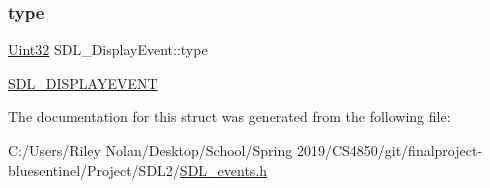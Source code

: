 \subsubsection{\texorpdfstring{type}{type}}
{\footnotesize\ttfamily \mbox{\hyperlink{_s_d_l__stdinc_8h_add440eff171ea5f55cb00c4a9ab8672d}{Uint32}} S\+D\+L\+\_\+\+Display\+Event\+::type}

\mbox{\hyperlink{_s_d_l__events_8h_a3b589e89be6b35c02e0dd34a55f3fccaa825818ce6265316146d7288601fd5974}{S\+D\+L\+\_\+\+D\+I\+S\+P\+L\+A\+Y\+E\+V\+E\+NT}} 

The documentation for this struct was generated from the following file\+:\begin{DoxyCompactItemize}
\item 
C\+:/\+Users/\+Riley Nolan/\+Desktop/\+School/\+Spring 2019/\+C\+S4850/git/finalproject-\/bluesentinel/\+Project/\+S\+D\+L2/\mbox{\hyperlink{_s_d_l__events_8h}{S\+D\+L\+\_\+events.\+h}}\end{DoxyCompactItemize}
